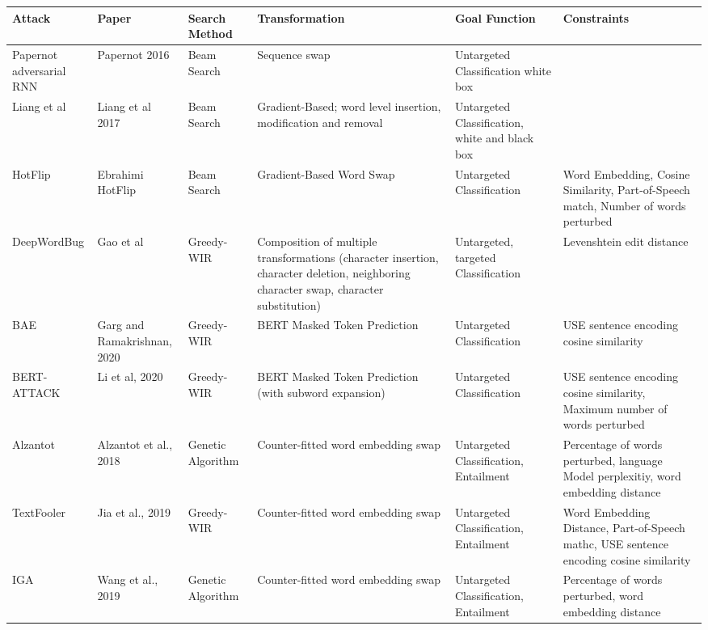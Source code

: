 \begin{table}
\small
\begin{tabular}{llllll}
\toprule
\textbf{Attack} &\textbf{Paper} &\textbf{Search Method} &\textbf{Transformation} &\textbf{Goal Function} &\textbf{Constraints}\\  
\midrule 
\makecell[l]{Papernot\\adversarial RNN}&Papernot 2016 & Beam Search &Sequence swap &Untargeted Classification white box & \\
Liang et al &Liang et al 2017 &Beam Search &Gradient-Based; word level insertion, modification and removal &Untargeted Classification, white and black box & \\

HotFlip &Ebrahimi HotFlip &Beam Search &Gradient-Based Word Swap &Untargeted Classification &Word Embedding, Cosine Similarity, Part-of-Speech match, Number of words perturbed \\

DeepWordBug &Gao et al &Greedy-WIR &Composition of multiple transformations (character insertion, character deletion, neighboring character swap, character substitution) &Untargeted, targeted Classification &Levenshtein edit distance \\

BAE &\makecell[l]{Garg and\\Ramakrishnan, 2020} &Greedy-WIR &BERT Masked Token Prediction &Untargeted Classification &USE sentence encoding cosine similarity \\

BERT-ATTACK &Li et al, 2020 &Greedy-WIR &BERT Masked Token Prediction (with subword expansion) &Untargeted Classification &USE sentence encoding cosine similarity, Maximum number of words perturbed \\

Alzantot &Alzantot et al., 2018 &Genetic Algorithm &Counter-fitted word embedding swap &Untargeted Classification, Entailment &Percentage of words perturbed, language Model perplexitiy, word embedding distance \\

TextFooler &Jia et al., 2019 &Greedy-WIR &Counter-fitted word embedding swap &Untargeted Classification, Entailment &Word Embedding Distance, Part-of-Speech mathc, USE sentence encoding cosine similarity \\

IGA &Wang et al., 2019 &Genetic Algorithm &Counter-fitted word embedding swap &Untargeted Classification, Entailment &Percentage of words perturbed, word embedding distance \\


\end{tabular}
\end{table}
